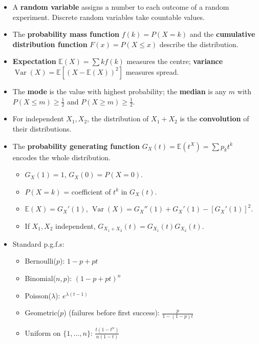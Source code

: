 \documentclass[11pt]{article}
\begin{document}
\begin{aretenir}
\begin{itemize}
\item A \textbf{random variable} assigns a number to each outcome of a random experiment. Discrete random variables take countable values.
\item The \textbf{probability mass function} $f(k)=P(X=k)$ and the \textbf{cumulative distribution function} $F(x)=P(X\le x)$ describe the distribution.
\item \textbf{Expectation} $\mathbb{E}(X)=\sum k f(k)$ measures the centre; \textbf{variance} $\operatorname{Var}(X)=\mathbb{E}[(X-\mathbb{E}(X))^2]$ measures spread.
\item The \textbf{mode} is the value with highest probability; the \textbf{median} is any $m$ with $P(X\le m)\ge\frac12$ and $P(X\ge m)\ge\frac12$.
\item For independent $X_1,X_2$, the distribution of $X_1+X_2$ is the \textbf{convolution} of their distributions.
\item The \textbf{probability generating function} $G_X(t)=\mathbb{E}(t^X)=\sum p_k t^k$ encodes the whole distribution. 
      \begin{itemize}
      \item $G_X(1)=1$, $G_X(0)=P(X=0)$.
      \item $P(X=k)$ = coefficient of $t^k$ in $G_X(t)$.
      \item $\mathbb{E}(X)=G_X'(1)$, $\operatorname{Var}(X)=G_X''(1)+G_X'(1)-[G_X'(1)]^2$.
      \item If $X_1,X_2$ independent, $G_{X_1+X_2}(t)=G_{X_1}(t)G_{X_2}(t)$.
      \end{itemize}
\item Standard p.g.f.s: 
      \begin{itemize}
      \item Bernoulli($p$): $1-p+pt$
      \item Binomial($n,p$): $(1-p+pt)^n$
      \item Poisson($\lambda$): $e^{\lambda(t-1)}$
      \item Geometric($p$) (failures before first success): $\frac{p}{1-(1-p)t}$
      \item Uniform on $\{1,\dots,n\}$: $\frac{t(1-t^n)}{n(1-t)}$
      \end{itemize}
\end{itemize}
\end{aretenir}
\end{document}
